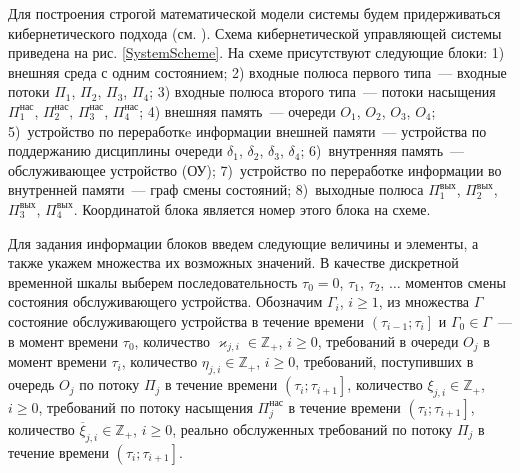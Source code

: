\documentclass[11pt]{ubs}
\begin{document}
Для построения строгой математической модели системы будем придерживаться кибернетического подхода (см. \cite{Zorine:2011:2}). Схема кибернетической управляющей системы приведена на рис. \ref{SystemScheme}. На схеме присутствуют следующие блоки: 1) внешняя среда с одним состоянием; 2) входные полюса первого типа~--- входные потоки $\Pi_1$, $\Pi_2$, $\Pi_3$, $\Pi_4$; 3) входные полюса второго типа~--- потоки насыщения $\Pi_1^{\mathrm{\text{нас}}}$, $\Pi_2^{\mathrm{\text{нас}}}$, $\Pi_3^{\mathrm{\text{нас}}}$, $\Pi_4^{\mathrm{\text{нас}}}$; 4) внешняя память~--- очереди $O_1$, $O_2$, $O_3$, $O_4$; 5)~устройство по переработкe информации внешней памяти~--- устройства по поддержанию дисциплины очереди $\delta_1$, $\delta_2$, $\delta_3$, $\delta_4$; 6)~внутренняя память~--- обслуживающее устройство (ОУ); 7)~устройство по переработке информации во внутренней памяти~--- граф смены состояний; 8)~выходные полюса $\Pi_1^{\mathrm{\text{вых}}}$, $\Pi_2^{\mathrm{\text{вых}}}$, $\Pi_3^{\mathrm{\text{вых}}}$, $\Pi_4^{\mathrm{\text{вых}}}$. Координатой блока является номер этого блока на схеме. 

Для задания информации блоков введем следующие величины и элементы, а также укажем множества их возможных значений. В качестве дискретной временной шкалы выберем последовательность $\tau_0=0$, $\tau_1$, $\tau_2$, $\ldots$ моментов смены состояния обслуживающего устройства. Обозначим $\Gamma_i$, $i\geqslant 1$, из множества $\Gamma$ состояние обслуживающего устройства в течение времени $\left(\tau_{i-1};\tau_i\right]$ и $\Gamma_0\in \Gamma$~--- в момент времени $\tau_0$, количество $\varkappa_{j,i} \in \mathbb{Z}_+ $, $i\geqslant 0$, требований в очереди $O_j$ в момент времени $\tau_i$, количество $\eta_{j,i} \in \mathbb{Z}_+$, $i\geqslant 0$, требований, поступивших в очередь $O_j$ по потоку $\Pi_j$ в течение времени $\left(\tau_{i};\tau_{i+1}\right]$, количество $\xi_{j,i} \in \mathbb{Z}_+$, $i\geqslant 0$, требований по потоку насыщения $\Pi^{\mathrm{\text{нас}}}_j$ в течение времени $\left(\tau_{i};\tau_{i+1}\right]$, количество $\overline{\xi}_{j,i}\in \mathbb{Z}_+$, $i\geqslant 0$, реально обслуженных требований по потоку $\Pi_j$ в течение времени $\left(\tau_{i};\tau_{i+1}\right]$.
\end{document}
